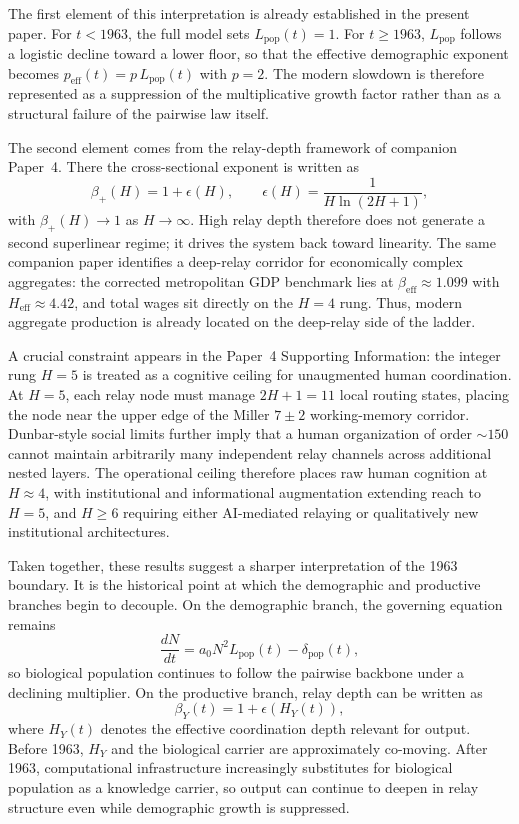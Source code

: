 \documentclass[11pt]{article}
\begin{document}
The first element of this interpretation is already established in the present
paper. For $t<1963$, the full model sets $L_{\mathrm{pop}}(t)=1$. For
$t\ge 1963$, $L_{\mathrm{pop}}$ follows a logistic decline toward a lower
floor, so that the effective demographic exponent becomes
$p_{\mathrm{eff}}(t)=p\,L_{\mathrm{pop}}(t)$ with $p=2$. The modern
slowdown is therefore represented as a suppression of the multiplicative growth
factor rather than as a structural failure of the pairwise law itself.

The second element comes from the relay-depth framework of companion Paper~4.
There the cross-sectional exponent is written as
\[
\beta_{+}(H)=1+\epsilon(H), \qquad
\epsilon(H)=\frac{1}{H\ln(2H+1)},
\]
with $\beta_{+}(H)\to 1$ as $H\to\infty$. High relay depth therefore does
not generate a second superlinear regime; it drives the system back toward
linearity. The same companion paper identifies a deep-relay corridor for
economically complex aggregates: the corrected metropolitan GDP benchmark lies
at $\beta_{\mathrm{eff}}\approx 1.099$ with
$H_{\mathrm{eff}}\approx 4.42$, and total wages sit directly on the $H=4$ rung.
Thus, modern aggregate production is already located on the deep-relay side of
the ladder.

A crucial constraint appears in the Paper~4 Supporting Information: the
integer rung $H=5$ is treated as a cognitive ceiling for unaugmented human
coordination. At $H=5$, each relay node must manage $2H+1=11$ local routing
states, placing the node near the upper edge of the Miller $7\pm 2$
working-memory corridor. Dunbar-style social limits further imply that a
human organization of order ${\sim}150$ cannot maintain arbitrarily many
independent relay channels across additional nested layers. The operational
ceiling therefore places raw human cognition at $H\approx 4$, with
institutional and informational augmentation extending reach to $H=5$, and
$H\ge 6$ requiring either AI-mediated relaying or qualitatively new
institutional architectures.

Taken together, these results suggest a sharper interpretation of the 1963
boundary. It is the historical point at which the demographic and productive
branches begin to decouple. On the demographic branch, the governing equation
remains
\[
\frac{dN}{dt}=a_0N^2L_{\mathrm{pop}}(t)-\delta_{\mathrm{pop}}(t),
\]
so biological population continues to follow the pairwise backbone under a
declining multiplier. On the productive branch, relay depth can be written as
\[
\beta_Y(t)=1+\epsilon\!\left(H_Y(t)\right),
\]
where $H_Y(t)$ denotes the effective coordination depth relevant for output.
Before 1963, $H_Y$ and the biological carrier are approximately co-moving.
After 1963, computational infrastructure increasingly substitutes for
biological population as a knowledge carrier, so output can continue to deepen
in relay structure even while demographic growth is suppressed.
\end{document}
